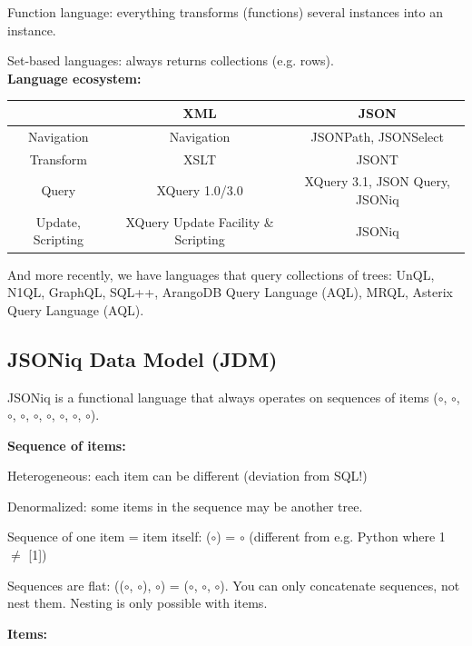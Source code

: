 \documentclass[11pt,oneside,a4paper]{article}
\begin{document}
{Function language: everything transforms (functions) several instances into an instance.

Set-based languages: always returns collections (e.g. rows).\\

\textbf{Language ecosystem:}

\begin{table}[hb!]
\begin{tabular}{|c|c|c|}
	\hline 
	& XML & JSON \\ 
	\hline 
	Navigation & Navigation & JSONPath,
	JSONSelect \\ 
	\hline 
	Transform & XSLT & JSONT \\ 
	\hline 
	Query & XQuery 1.0/3.0 & XQuery 3.1,
	JSON Query,
	JSONiq \\ 
	\hline 
	Update,	Scripting & XQuery Update Facility \& Scripting & JSONiq \\ 
	\hline 
\end{tabular} 
\end{table}

And more recently, we have languages that query collections of trees: UnQL, N1QL, GraphQL, SQL++, ArangoDB Query Language (AQL), MRQL, Asterix Query Language (AQL).


\subsection{JSONiq Data Model (JDM)}

JSONiq is a functional language that always operates on sequences of items ($\circ$, $\circ$, $\circ$, $\circ$, $\circ$, $\circ$, $\circ$, $\circ$, $\circ$).

\textbf{Sequence of items:}

\begin{compactitem}
\item Heterogeneous: each item can be different (deviation from SQL!)
\item Denormalized: some items in the sequence may be another tree.
\item Sequence of one item = item itself: ($\circ$) = $\circ$ (different from e.g. Python where 1 $\neq$ [1])
\item Sequences are flat: (($\circ$, $\circ$), $\circ$) = ($\circ$, $\circ$, $\circ$). You can only concatenate sequences, not nest them. Nesting is only possible with items.
\end{compactitem}

\textbf{Items:}

}
\end{document}
